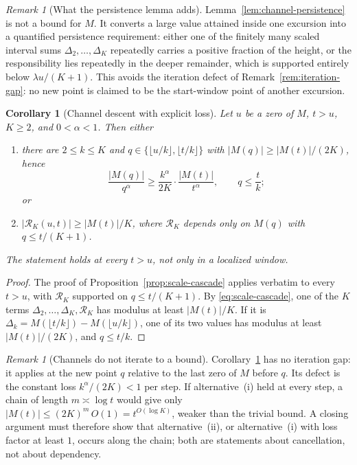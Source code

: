 \documentclass[11pt]{amsart}
\numberwithin{equation}{section}
\theoremstyle{plain}
\newtheorem{corollary}[theorem]{Corollary}
\theoremstyle{definition}
\theoremstyle{remark}
\newtheorem{remark}[theorem]{Remark}
\begin{document}
\begin{remark}[What the persistence lemma adds]
\label{rem:persistence-content}
Lemma~\ref{lem:channel-persistence} is not a bound for $M$.  It converts a
large value attained inside one excursion into a quantified persistence
requirement: either one of the finitely many scaled interval sums
$\Delta_2,\ldots,\Delta_K$ repeatedly carries a positive fraction of the
height, or the responsibility lies repeatedly in the deeper remainder,
which is supported entirely below $\lambda u/(K+1)$.  This avoids the
iteration defect of Remark~\ref{rem:iteration-gap}: no new point is claimed
to be the start-window point of another excursion.
\end{remark}
\begin{corollary}[Channel descent with explicit loss]
\label{cor:channel-descent}
Let $u$ be a zero of $M$, $t>u$, $K\ge2$, and $0<\alpha<1$. Then either
\begin{enumerate}[label=\textup{(\roman*)}]
\item there are $2\le k\le K$ and $q\in\{\lfloor u/k\rfloor,\lfloor t/k\rfloor\}$
with $|M(q)|\ge|M(t)|/(2K)$, hence
\[
\frac{|M(q)|}{q^\alpha}\ge\frac{k^\alpha}{2K}\cdot\frac{|M(t)|}{t^\alpha},
\qquad q\le\frac tk;
\]
or
\item $|\mathcal R_K(u,t)|\ge|M(t)|/K$, where $\mathcal R_K$ depends only on
$M(q)$ with $q\le t/(K+1)$.
\end{enumerate}
The statement holds at every $t>u$, not only in a localized window.
\end{corollary}

\begin{proof}
The proof of Proposition~\ref{prop:scale-cascade} applies verbatim to every
$t>u$, with $\mathcal R_K$ supported on $q\le t/(K+1)$. By \eqref{eq:scale-cascade}, one of the $K$ terms
$\Delta_2,\dots,\Delta_K,\mathcal R_K$ has modulus at least $|M(t)|/K$. If it is
$\Delta_k=M(\lfloor t/k\rfloor)-M(\lfloor u/k\rfloor)$, one of its two values
has modulus at least $|M(t)|/(2K)$, and $q\le t/k$.
\end{proof}

\begin{remark}[Channels do not iterate to a bound]
\label{rem:channel-loss}
Corollary~\ref{cor:channel-descent} has no iteration gap: it applies at
the new point $q$ relative to the last zero of $M$ before $q$. Its defect
is the constant loss $k^\alpha/(2K)<1$ per step. If alternative~(i) held at
every step, a chain of length $m\asymp\log t$ would give only
$|M(t)|\le(2K)^m\,O(1)=t^{O(\log K)}$, weaker than the trivial bound.
A closing argument must therefore show that alternative~(ii), or
alternative~(i) with loss factor at least $1$, occurs along the chain; both
are statements about cancellation, not about dependency.
\end{remark}
\end{document}
